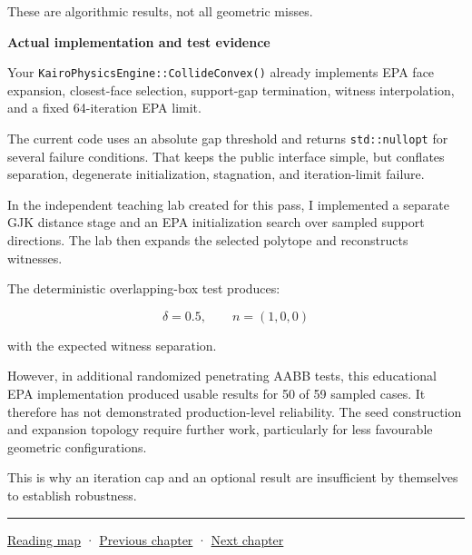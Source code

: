 These are algorithmic results, not all geometric misses.

\textbf{Actual implementation and test evidence}

Your \texttt{KairoPhysicsEngine::CollideConvex()} already implements EPA face expansion, closest-face selection, support-gap termination, witness interpolation, and a fixed 64-iteration EPA limit.

The current code uses an absolute gap threshold and returns \texttt{std::nullopt} for several failure conditions. That keeps the public interface simple, but conflates separation, degenerate initialization, stagnation, and iteration-limit failure.

In the independent teaching lab created for this pass, I implemented a separate GJK distance stage and an EPA initialization search over sampled support directions. The lab then expands the selected polytope and reconstructs witnesses.

The deterministic overlapping-box test produces:

\[
\boxed{ \delta=0.5,\qquad n=(1,0,0) }
\]

with the expected witness separation.

However, in additional randomized penetrating AABB tests, this educational EPA implementation produced usable results for 50 of 59 sampled cases. It therefore has not demonstrated production-level reliability. The seed construction and expansion topology require further work, particularly for less favourable geometric configurations.

This is why an iteration cap and an optional result are insufficient by themselves to establish robustness.

\begin{center}\rule{0.5\linewidth}{0.5pt}\end{center}

\hyperref[volume-reading-map]{Reading map} · \hyperref[04-visual-computing-ii-ch024-raytriangle-intersection]{Previous chapter} · \hyperref[04-visual-computing-ii-ch026-contact-features-and-manifolds]{Next chapter}
